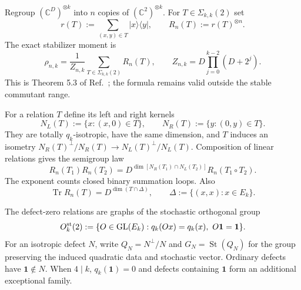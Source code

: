 \documentclass[journal,twocolumn]{IEEEtran}
\theoremstyle{definition}
\theoremstyle{plain}
\newcommand{\Tr}{\operatorname{Tr}}
\newcommand{\St}{\operatorname{St}}
\newcommand{\one}{\bm 1}
\begin{document}
Regroup $(\mathbb C^D)^{\otimes k}$ into $n$ copies of
$(\mathbb C^2)^{\otimes k}$.  For $T\in\Sigma_{k,k}(2)$ set
\begin{equation}
 r(T):=\sum_{(x,y)\in T}|x\rangle\!\langle y|,
 \qquad R_n(T):=r(T)^{\otimes n}.
 \label{eqS:Rrelation}
\end{equation}
The exact stabilizer moment is
\begin{equation}
 \rho_{n,k}=\frac1{Z_{n,k}}
 \sum_{T\in\Sigma_{k,k}(2)}R_n(T),
 \qquad
 Z_{n,k}=D\prod_{j=0}^{k-2}(D+2^j).
 \label{eqS:moment-GNW}
\end{equation}
This is Theorem 5.3 of Ref.~\cite{GrossNezamiWalter2021}; the formula remains
valid outside the stable commutant range.

For a relation $T$ define its left and right kernels
\begin{equation}
 N_L(T):=\{x:(x,0)\in T\},\qquad
 N_R(T):=\{y:(0,y)\in T\}.
 \label{eqS:defects}
\end{equation}
They are totally $q_k$-isotropic, have the same dimension, and $T$ induces
an isometry
$N_R(T)^\perp/N_R(T)\to N_L(T)^\perp/N_L(T)$.  Composition of linear
relations gives the semigroup law
\begin{equation}
 R_n(T_1)R_n(T_2)
 =D^{\dim[N_R(T_1)\cap N_L(T_2)]}R_n(T_1\circ T_2).
 \label{eqS:semigroup}
\end{equation}
The exponent counts closed binary summation loops.  Also
\begin{equation}
 \Tr R_n(T)=D^{\dim(T\cap\Delta)},
 \qquad \Delta:=\{(x,x):x\in E_k\}.
 \label{eqS:relation-trace}
\end{equation}

The defect-zero relations are graphs of the stochastic orthogonal group
\begin{equation}
 O_k^{\rm st}(2):=
 \{O\in\mathrm{GL}(E_k):q_k(Ox)=q_k(x),\ O\one=\one\}.
 \label{eqS:stochastic-group}
\end{equation}
For an isotropic defect $N$, write
$Q_N=N^\perp/N$ and $G_N=\St(Q_N)$ for the group preserving the induced
quadratic data and stochastic vector.  Ordinary defects have $\one\notin N$.
When $4\mid k$, $q_k(\one)=0$ and defects containing $\one$ form an
additional exceptional family.
\end{document}
